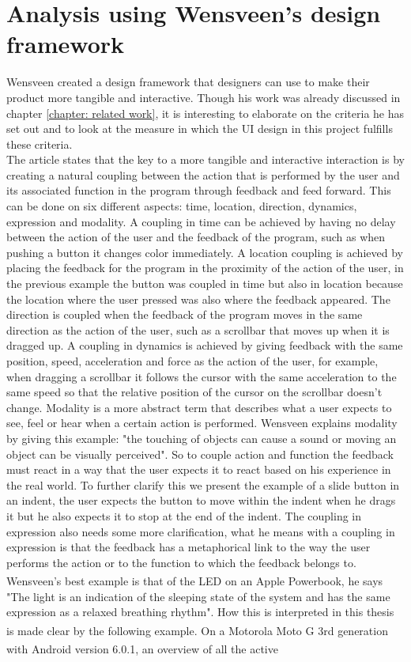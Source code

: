\section{Analysis using Wensveen's design framework}

Wensveen \cite{Wensveen2004} created a design framework that designers can use to make their product more tangible and interactive. Though his work was already discussed in chapter \ref{chapter: related work}, it is interesting to elaborate on the criteria he has set out and to look at the measure in which the UI design in this project fulfills these criteria.\\
The article states that the key to a more tangible and interactive interaction is by creating a natural coupling between the action that is performed by the user and its associated function in the program through feedback and feed forward. This can be done on six different aspects: time, location, direction, dynamics, expression and modality. A coupling in time can be achieved by having no delay between the action of the user and the feedback of the program, such as when pushing a button it changes color immediately. A location coupling is achieved by placing the feedback for the program in the proximity of the action of the user, in the previous example the button was coupled in time but also in location because the location where the user pressed was also where the feedback appeared. The direction is coupled when\textsc{} the feedback of the program moves in the same direction as the action of the user, such as a scrollbar that moves up when it is dragged up. A coupling in dynamics is achieved by giving feedback with the same position, speed, acceleration and force as the action of the user, for example, when dragging a scrollbar it follows the cursor with the same acceleration to the same speed so that the relative position of the cursor on the scrollbar doesn't change. Modality is a more abstract term that describes what a user expects to see, feel or hear when a certain action is performed. Wensveen explains modality by giving this example: "the touching of objects can cause a sound or moving an object can be visually perceived". So to couple action and function the feedback must react in a way that the user expects it to react based on his experience in the real world. To further clarify this we present the example of a slide button in an indent, the user expects the button to move within the indent when he drags it but he also expects it to stop at the end of the indent. The coupling in expression also needs some more clarification, what he means with a coupling in expression is that the feedback has a metaphorical link to the way the user performs the action or to the function to which the feedback belongs to. Wensveen's best example is that of the LED on an Apple Powerbook\textsuperscript{\textregistered}, he says "The light is an indication of the sleeping state of the system and has the same expression as a relaxed breathing rhythm". How this is interpreted in this thesis is made clear by the following example. On a Motorola Moto G\textsuperscript{\textregistered} 3rd generation with Android\textsuperscript{\textregistered} version 6.0.1, an overview of all the active 